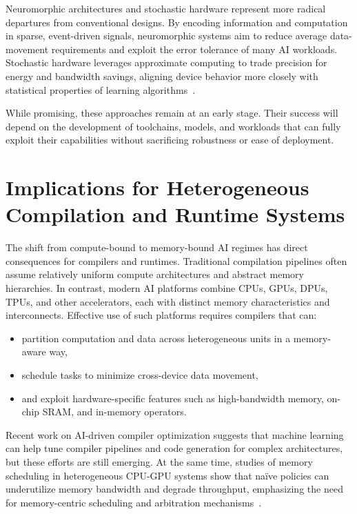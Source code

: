 \documentclass[conference]{IEEEtran}
\begin{document}
Neuromorphic architectures and stochastic hardware represent more radical departures from conventional designs. By encoding information and computation in sparse, event-driven signals, neuromorphic systems aim to reduce average data-movement requirements and exploit the error tolerance of many AI workloads. Stochastic hardware leverages approximate computing to trade precision for energy and bandwidth savings, aligning device behavior more closely with statistical properties of learning algorithms~\cite{roy2025breaking}.

While promising, these approaches remain at an early stage. Their success will depend on the development of toolchains, models, and workloads that can fully exploit their capabilities without sacrificing robustness or ease of deployment.

\section{Implications for Heterogeneous Compilation and Runtime Systems}
\label{sec:compilers}

The shift from compute-bound to memory-bound AI regimes has direct consequences for compilers and runtimes. Traditional compilation pipelines often assume relatively uniform compute architectures and abstract memory hierarchies. In contrast, modern AI platforms combine CPUs, GPUs, DPUs, TPUs, and other accelerators, each with distinct memory characteristics and interconnects. Effective use of such platforms requires compilers that can:
\begin{itemize}
    \item partition computation and data across heterogeneous units in a memory-aware way,
    \item schedule tasks to minimize cross-device data movement,
    \item and exploit hardware-specific features such as high-bandwidth memory, on-chip SRAM, and in-memory operators.
\end{itemize}

Recent work on AI-driven compiler optimization suggests that machine learning can help tune compiler pipelines and code generation for complex architectures, but these efforts are still emerging. At the same time, studies of memory scheduling in heterogeneous CPU-GPU systems show that naïve policies can underutilize memory bandwidth and degrade throughput, emphasizing the need for memory-centric scheduling and arbitration mechanisms~\cite{heterogeneous2021,memorycompilers2026}.
\end{document}
